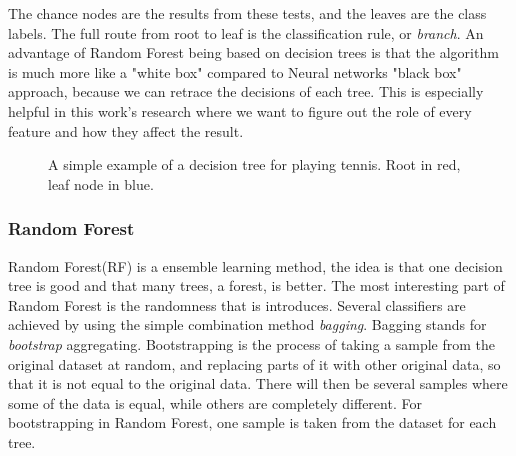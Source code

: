 The chance nodes are the results from these tests, and the leaves are the class labels. The full route from root to leaf is the classification rule, or \textit{branch}. An advantage of Random Forest being based on decision trees is that the algorithm is much more like a "white box" compared to Neural networks "black box" approach, because we can retrace the decisions of each tree. This is especially helpful in this work's research where we want to figure out the role of every feature and how they affect the result.

\begin{figure}[h]
\centering
{}
\caption{A simple example of a decision tree for playing tennis. Root in red, leaf node in blue.}
\label{fig:decision_tree}
\end{figure}
\subsubsection{Random Forest}
Random Forest(\ac{RF}) is a ensemble learning method, the idea is that one decision tree is good and that many trees, a forest, is better. The most interesting part of Random Forest is the randomness that is introduces. Several classifiers are achieved by using the simple combination method \textit{bagging}. Bagging stands for \textit{bootstrap} aggregating. Bootstrapping is the process of taking a sample from the original dataset at random, and replacing parts of it with other original data, so that it is not equal to the original data. There will then be several samples where some of the data is equal, while others are completely different. For bootstrapping in Random Forest, one sample is taken from the dataset for each tree.

